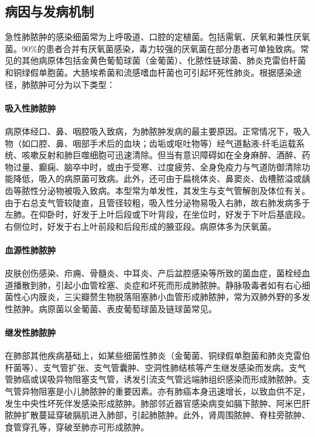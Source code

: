 \subsection{病因与发病机制}

急性肺脓肿的感染细菌常为上呼吸道、口腔的定植菌。包括需氧、厌氧和兼性厌氧菌。90\%的患者合并有厌氧菌感染，毒力较强的厌氧菌在部分患者可单独致病。常见的其他病原体包括金黄色葡萄球菌（金葡菌）、化脓性链球菌、肺炎克雷伯杆菌和铜绿假单胞菌。大肠埃希菌和流感嗜血杆菌也可引起坏死性肺炎。根据感染途径，肺脓肿可分为以下类型：

\paragraph{吸入性肺脓肿}

病原体经口、鼻、咽腔吸入致病，为肺脓肿发病的最主要原因。正常情况下，吸入物（如口腔、鼻、咽部手术后的血块；齿垢或呕吐物等）经气道黏液-纤毛运载系统、咳嗽反射和肺巨噬细胞可迅速清除。但当有意识障碍如在全身麻醉、酒醉、药物过量、癫痫、脑卒中时，或由于受寒、过度疲劳、全身免疫力与气道防御清除功能降低，吸入的病原菌可致病。此外，还可由于扁桃体炎、鼻窦炎、齿槽脓溢或龋齿等脓性分泌物被吸入致病。本型常为单发性，其发生与支气管解剖及体位有关。由于右总支气管较陡直，且管径较粗，吸入性分泌物易吸入右肺，故右肺发病多于左肺。在仰卧时，好发于上叶后段或下叶背段，在坐位时，好发于下叶后基底段。右侧位时，好发于右上叶前段和后段形成的腋亚段。病原体多为厌氧菌。

\paragraph{血源性肺脓肿}

皮肤创伤感染、疖痈、骨髓炎、中耳炎、产后盆腔感染等所致的菌血症，菌栓经血道播散到肺，引起小血管栓塞、炎症和坏死而形成肺脓肿。静脉吸毒者如有右心细菌性心内膜炎，三尖瓣赘生物脱落阻塞肺小血管形成肺脓肿，常为双肺外野的多发性脓肿。病原菌以金葡菌、表皮葡萄球菌及链球菌常见。

\paragraph{继发性肺脓肿}

在肺部其他疾病基础上，如某些细菌性肺炎（金葡菌、铜绿假单胞菌和肺炎克雷伯杆菌等）、支气管扩张、支气管囊肿、空洞性肺结核等产生继发感染而发病。支气管肺癌或误吸异物阻塞支气管，诱发引流支气管远端肺组织感染而形成肺脓肿。支气管异物阻塞是小儿肺脓肿的重要因素。亦有肺癌本身迅速增长，以致血供不足，发生中央性坏死伴发感染形成脓肿。肺部邻近器官感染病变如膈下脓肿、阿米巴肝脓肿扩散蔓延穿破膈肌进入肺部，引起肺脓肿。此外，肾周围脓肿、脊柱旁脓肿、食管穿孔等，穿破至肺亦可形成脓肿。


